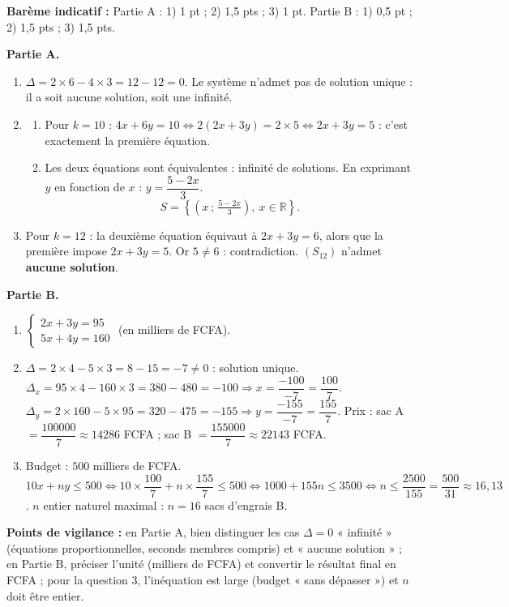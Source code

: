 \documentclass[11pt]{article}
\begin{document}
\begin{corrige}
\textbf{Barème indicatif :} Partie A : 1) 1 pt ; 2) 1,5 pts ; 3) 1 pt. Partie B : 1) 0,5 pt ; 2) 1,5 pts ; 3) 1,5 pts.

\textbf{Partie A.}
\begin{enumerate}
\item $\Delta=2\times 6-4\times 3=12-12=0$. Le système n'admet pas de solution unique : il a soit aucune solution, soit une infinité.
\item \begin{enumerate}
\item Pour $k=10$ : $4x+6y=10 \Leftrightarrow 2(2x+3y)=2\times 5 \Leftrightarrow 2x+3y=5$ : c'est exactement la première équation.
\item Les deux équations sont équivalentes : infinité de solutions. En exprimant $y$ en fonction de $x$ : $y=\dfrac{5-2x}{3}$.
\[ S=\left\{\left(x\,;\,\tfrac{5-2x}{3}\right),\ x\in\mathbb{R}\right\}. \]
\end{enumerate}
\item Pour $k=12$ : la deuxième équation équivaut à $2x+3y=6$, alors que la première impose $2x+3y=5$. Or $5\neq 6$ : contradiction. $(S_{12})$ n'admet \textbf{aucune solution}.
\end{enumerate}

\textbf{Partie B.}
\begin{enumerate}
\item $\begin{cases} 2x+3y=95\\ 5x+4y=160 \end{cases}$ (en milliers de FCFA).
\item $\Delta=2\times 4-5\times 3=8-15=-7\neq 0$ : solution unique.
$\Delta_x=95\times 4-160\times 3=380-480=-100 \Rightarrow x=\dfrac{-100}{-7}=\dfrac{100}{7}$.
$\Delta_y=2\times 160-5\times 95=320-475=-155 \Rightarrow y=\dfrac{-155}{-7}=\dfrac{155}{7}$.
Prix : sac A $=\dfrac{\num{100000}}{7}\approx \num{14286}$ FCFA ; sac B $=\dfrac{\num{155000}}{7}\approx \num{22143}$ FCFA.
\item Budget : $500$ milliers de FCFA. $10x+ny\le 500 \Leftrightarrow 10\times\dfrac{100}{7}+n\times\dfrac{155}{7}\le 500 \Leftrightarrow 1000+155n\le 3500 \Leftrightarrow n\le \dfrac{2500}{155}=\dfrac{500}{31}\approx 16{,}13$.
$n$ entier naturel maximal : $n=16$ sacs d'engrais B.
\end{enumerate}
\textbf{Points de vigilance :} en Partie A, bien distinguer les cas $\Delta=0$ « infinité » (équations proportionnelles, seconds membres compris) et « aucune solution » ; en Partie B, préciser l'unité (milliers de FCFA) et convertir le résultat final en FCFA ; pour la question 3, l'inéquation est large (budget « sans dépasser ») et $n$ doit être entier.
\end{corrige}
\end{document}
